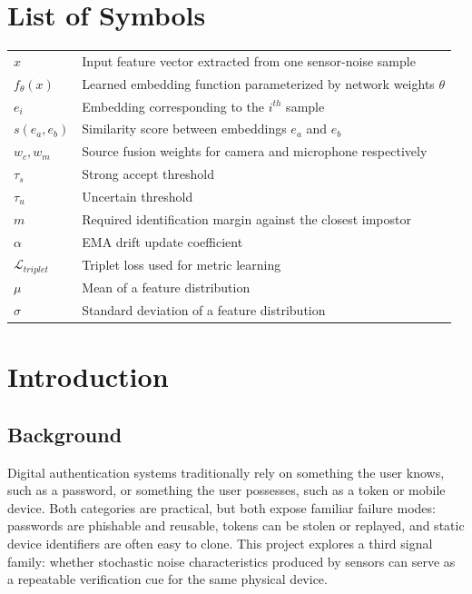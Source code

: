 \documentclass[12pt]{report}
\begin{document}
\chapter*{List of Symbols}
\begin{longtable}{p{}p{}}
$x$ & Input feature vector extracted from one sensor-noise sample \\
$f_{\theta}(x)$ & Learned embedding function parameterized by network weights $\theta$ \\
$e_i$ & Embedding corresponding to the $i^{th}$ sample \\
$s(e_a, e_b)$ & Similarity score between embeddings $e_a$ and $e_b$ \\
$w_c, w_m$ & Source fusion weights for camera and microphone respectively \\
$\tau_s$ & Strong accept threshold \\
$\tau_u$ & Uncertain threshold \\
$m$ & Required identification margin against the closest impostor \\
$\alpha$ & EMA drift update coefficient \\
$\mathcal{L}_{triplet}$ & Triplet loss used for metric learning \\
$\mu$ & Mean of a feature distribution \\
$\sigma$ & Standard deviation of a feature distribution \\
\end{longtable}

\newpage
{}
\setcounter{page}{1}

\chapter{Introduction}
\justifying
\section{Background}
Digital authentication systems traditionally rely on something the user knows, such as a password, or something the user possesses, such as a token or mobile device. Both categories are practical, but both expose familiar failure modes: passwords are phishable and reusable, tokens can be stolen or replayed, and static device identifiers are often easy to clone. This project explores a third signal family: whether stochastic noise characteristics produced by sensors can serve as a repeatable verification cue for the same physical device.
\end{document}

